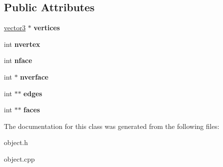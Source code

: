 \subsection*{Public Attributes}
\begin{DoxyCompactItemize}
\item 
\mbox{\label{classobject_a4bb3259d49eab5e0207979cdb7ca5e4d}} 
\mbox{\hyperlink{structvector3}{vector3}} $\ast$ {\bfseries vertices}
\item 
\mbox{\label{classobject_ae24b90c4cee184513abb2ca7eb59cd3e}} 
int {\bfseries nvertex}
\item 
\mbox{\label{classobject_a18744656bb9da2ca890705a7c6c2c3eb}} 
int {\bfseries nface}
\item 
\mbox{\label{classobject_abd9a796c4b8e871f2cccd904ae922b58}} 
int $\ast$ {\bfseries nverface}
\item 
\mbox{\label{classobject_a9cc733d5a57c8fe1685bd44cff92241b}} 
int $\ast$$\ast$ {\bfseries edges}
\item 
\mbox{\label{classobject_a0c81dba6ef82e25b92fce96fb8e6a127}} 
int $\ast$$\ast$ {\bfseries faces}
\end{DoxyCompactItemize}


The documentation for this class was generated from the following files\+:\begin{DoxyCompactItemize}
\item 
object.\+h\item 
object.\+cpp\end{DoxyCompactItemize}
